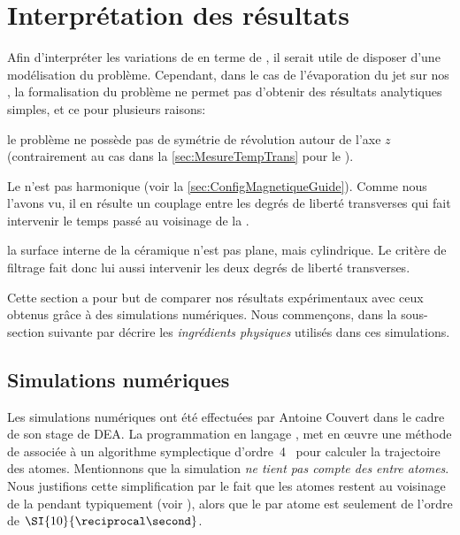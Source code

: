 \casse


\section{Interprétation des résultats}

Afin d'interpréter les variations de \fat en terme de \fispse, il serait utile de disposer d'une modélisation du problème. Cependant, dans le cas de l'évaporation du jet sur nos \pdecs, la formalisation du problème ne permet pas d'obtenir des résultats analytiques simples, et ce pour plusieurs raisons:
\begin{itemizel}
	\item le problème ne possède pas de symétrie de révolution autour de l'axe $z$ (contrairement au cas dans la \autoref{sec:MesureTempTrans} pour le \firf).
	\item Le \ppt n'est pas harmonique (voir la \autoref{sec:ConfigMagnetiqueGuide}). Comme nous l'avons vu, il en résulte un couplage entre les degrés de liberté transverses qui fait intervenir le temps passé au voisinage de la \pdec.
	\item la surface interne de la céramique n'est pas plane, mais cylindrique. Le critère de filtrage fait donc lui aussi intervenir les deux degrés de liberté transverses.
\end{itemizel}
Cette section a pour but de comparer nos résultats expérimentaux avec ceux obtenus grâce à des simulations numériques. Nous commençons, dans la sous-section suivante par décrire les \emph{ingrédients physiques} utilisés dans ces simulations.

\subsection{Simulations numériques}\label{sec:CeramSimu}
Les simulations numériques ont été effectuées par Antoine Couvert dans le cadre de son stage de DEA. La programmation en langage , met en \oe uvre une méthode de  associée à un algorithme symplectique d'ordre~4~\cite{Yos93} pour calculer la trajectoire des atomes. 
Mentionnons que la simulation \emph{ne tient pas compte des \colels entre atomes}. Nous justifions cette simplification par le fait que les atomes restent au voisinage de la \pdec pendant typiquement  (voir ), alors que le \tcolel par atome est seulement de l'ordre de $\SI{10}{\reciprocal\second}$.

